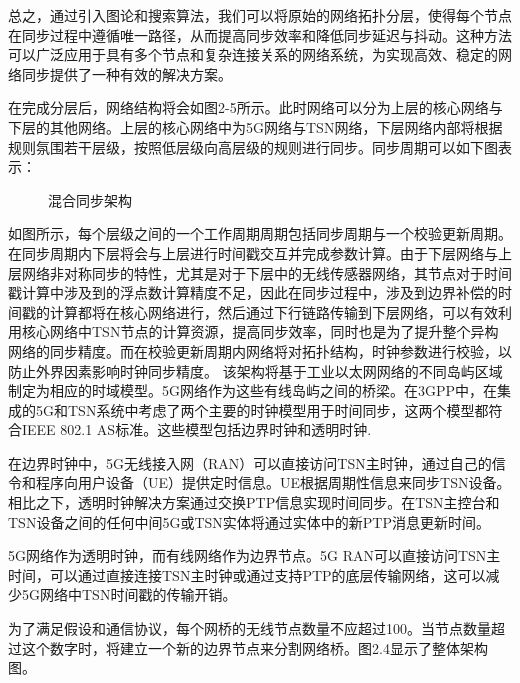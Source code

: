 \documentclass[UTF8,a4paper,12pt]{ctexart}
\numberwithin{equation}{section}
\begin{document}
总之，通过引入图论和搜索算法，我们可以将原始的网络拓扑分层，使得每个节点在同步过程中遵循唯一路径，从而提高同步效率和降低同步延迟与抖动。这种方法可以广泛应用于具有多个节点和复杂连接关系的网络系统，为实现高效、稳定的网络同步提供了一种有效的解决方案。


在完成分层后，网络结构将会如图2-5所示。此时网络可以分为上层的核心网络与下层的其他网络。上层的核心网络中为5G网络与TSN网络，下层网络内部将根据规则氛围若干层级，按照低层级向高层级的规则进行同步。同步周期可以如下图表示：

\begin{figure}[htb]
	\caption{\label{1} 混合同步架构}
\end{figure}
如图所示，每个层级之间的一个工作周期周期包括同步周期与一个校验更新周期。在同步周期内下层将会与上层进行时间戳交互并完成参数计算。由于下层网络与上层网络非对称同步的特性，尤其是对于下层中的无线传感器网络，其节点对于时间戳计算中涉及到的浮点数计算精度不足，因此在同步过程中，涉及到边界补偿的时间戳的计算都将在核心网络进行，然后通过下行链路传输到下层网络，可以有效利用核心网络中TSN节点的计算资源，提高同步效率，同时也是为了提升整个异构网络的同步精度。而在校验更新周期内网络将对拓扑结构，时钟参数进行校验，以防止外界因素影响时钟同步精度。
该架构将基于工业以太网网络的不同岛屿区域制定为相应的时域模型。5G网络作为这些有线岛屿之间的桥梁。在3GPP中，在集成的5G和TSN系统中考虑了两个主要的时钟模型用于时间同步，这两个模型都符合IEEE 802.1 AS标准。这些模型包括边界时钟和透明时钟\cite{9615318}.

在边界时钟中，5G无线接入网（RAN）可以直接访问TSN主时钟，通过自己的信令和程序向用户设备（UE）提供定时信息。UE根据周期性信息来同步TSN设备。相比之下，透明时钟解决方案通过交换PTP信息实现时间同步。在TSN主控台和TSN设备之间的任何中间5G或TSN实体将通过实体中的新PTP消息更新时间。

5G网络作为透明时钟，而有线网络作为边界节点。5G RAN可以直接访问TSN主时间，可以通过直接连接TSN主时钟或通过支持PTP的底层传输网络，这可以减少5G网络中TSN时间戳的传输开销。

为了满足假设和通信协议，每个网桥的无线节点数量不应超过100。当节点数量超过这个数字时，将建立一个新的边界节点来分割网络桥。图2.4显示了整体架构图。
\end{document}
